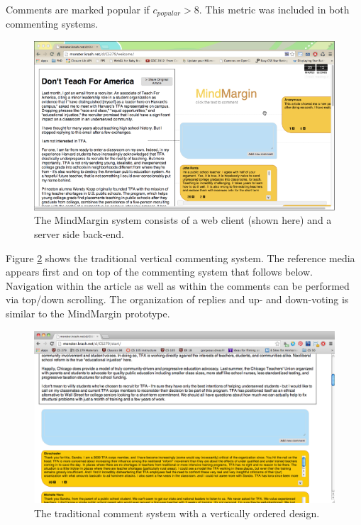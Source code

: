 Comments are marked popular if $c_{popular} > 8$. This metric was included in both commenting systems.
   
\begin{figure}
\centering
\includegraphics[scale=0.3]{mindmargin.png} 
\caption{The MindMargin system consists of a web client (shown here) and a server side back-end.}
\label{fig:frontend}
\end{figure}

Figure \ref{fig:traditional} shows the traditional vertical commenting system. The reference media appears first and on top of the commenting system that follows below. Navigation within the article as well as within the comments can be performed via top/down scrolling. The organization of replies and up- and down-voting is similar to the MindMargin prototype.

\begin{figure}
\centering
\includegraphics[scale=0.18]{traditional.png} 
\caption{The traditional comment system with a vertically ordered design.}
\label{fig:traditional}
\end{figure}

